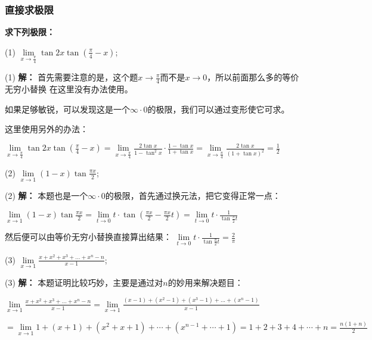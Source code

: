 \documentclass[12pt , a4paper , oneside]{ctexart}
\begin{document}
            \subsubsection{直接求极限}
            \textbf{求下列极限：}

            (1) $\lim\limits_{x \to \frac{\pi}{4}} \tan{2x} \tan{(\frac{\pi}{4}-x)}$;

            \begin{mdframed}
            (1) \textbf{解：}
            首先需要注意的是，这个题$x \to \frac{\pi}{4}$而不是$x \to 0$，所以前面那么多的等价无穷小替换
            在这里没有办法使用。
    
            如果足够敏锐，可以发现这是一个$\infty \cdot 0$的极限，我们可以通过变形使它可求。

            这里使用另外的办法：

            $\lim\limits_{x \to \frac{\pi}{4}} \tan{2x} \tan{(\frac{\pi}{4}-x)} =
            \lim\limits_{x \to \frac{\pi}{4}} \frac{2\tan x}{1-\tan^2 x} \cdot \frac{1-\tan x}{1+\tan x}
            =\lim\limits_{x \to \frac{\pi}{4}} \frac{2\tan x}{(1+\tan x)^2}=\frac{1}{2}$

            \end{mdframed}

            (2) $\lim\limits_{x \to 1} (1-x)\tan{\frac{\pi x}{2}}$;

            \begin{mdframed}
            (2) \textbf{解：}
            本题也是一个$\infty \cdot 0$的极限，首先通过换元法，把它变得正常一点：

            $\lim\limits_{x \to 1} (1-x)\tan{\frac{\pi x}{2}} = 
            \lim\limits_{t \to 0} t \cdot \tan{(\frac{\pi x}{2} - \frac{\pi x}{2} t)} = 
            \lim\limits_{t \to 0} t \cdot \frac{1}{\tan{\frac{\pi}{2} t}}$

            然后便可以由等价无穷小替换直接算出结果：
            $\lim\limits_{t \to 0} t \cdot \frac{1}{\tan{\frac{\pi}{2} t}} = \frac{2}{\pi}$
            \end{mdframed}

            (3) $\lim\limits_{x \to 1} \frac{x+x^2+x^3+...+x^n - n}{x-1}$;
            \begin{mdframed}
            (3) \textbf{解：}
            本题证明比较巧妙，主要是通过对$n$的妙用来解决题目：

            $\lim\limits_{x \to 1} \frac{x+x^2+x^3+...+x^n - n}{x-1}
            = \lim\limits_{x \to 1} \frac{(x-1)+(x^2-1)+(x^3-1)+...+(x^n - 1)}{x-1}$

            $= \lim\limits_{x \to 1} 1+(x+1)+(x^2+x+1)+\cdots+(x^{n-1}+\cdots+ 1)
            = 1+2+3+4+\cdots+n = \frac{n(1+n)}{2}$
            \end{mdframed}
\end{document}
